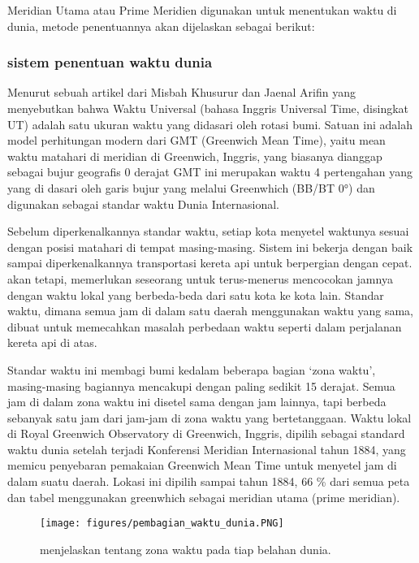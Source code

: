 	Meridian Utama atau Prime Meridien digunakan untuk menentukan waktu di dunia, metode penentuannya akan dijelaskan sebagai berikut:

\subsubsection{sistem penentuan waktu dunia}
	
	Menurut sebuah artikel dari Misbah Khusurur dan Jaenal Arifin yang menyebutkan bahwa Waktu Universal (bahasa Inggris Universal Time, disingkat UT) adalah satu ukuran waktu yang didasari oleh rotasi bumi. Satuan ini adalah model perhitungan modern dari GMT (Greenwich Mean Time), yaitu mean waktu matahari di meridian di Greenwich, Inggris, yang biasanya dianggap sebagai bujur geografis 0 derajat GMT ini merupakan waktu 4 pertengahan yang yang di dasari oleh garis bujur yang melalui Greenwhich (BB/BT 0°) dan digunakan sebagai standar waktu Dunia Internasional.
	
	Sebelum diperkenalkannya standar waktu, setiap kota menyetel waktunya sesuai dengan posisi matahari di tempat masing-masing. Sistem ini bekerja 
dengan baik sampai diperkenalkannya transportasi kereta api untuk berpergian dengan cepat. akan tetapi, memerlukan seseorang untuk terus-menerus mencocokan 
jamnya dengan waktu lokal yang berbeda-beda dari satu kota ke kota lain. Standar waktu, dimana semua jam di dalam satu daerah menggunakan waktu yang sama, 
dibuat untuk memecahkan masalah perbedaan waktu seperti dalam perjalanan kereta api di atas.

	Standar waktu ini membagi bumi kedalam beberapa bagian `zona waktu', masing-masing bagiannya mencakupi dengan paling sedikit 15 derajat. Semua jam di dalam
zona waktu ini disetel sama dengan jam lainnya, tapi berbeda sebanyak satu jam dari jam-jam di zona waktu yang bertetanggaan. 
Waktu lokal di Royal Greenwich Observatory di Greenwich, Inggris, dipilih sebagai standard waktu dunia setelah terjadi 
Konferensi Meridian Internasional tahun 1884, yang memicu penyebaran pemakaian Greenwich Mean Time untuk menyetel jam di dalam suatu daerah. 
Lokasi ini dipilih sampai tahun 1884, 66 \% dari semua peta dan tabel menggunakan greenwhich sebagai meridian utama (prime meridian).

\begin{figure}[ht]
\centerline{\texttt{[image: figures/pembagian\_waktu\_dunia.PNG]}}
\caption{menjelaskan tentang zona waktu pada tiap belahan dunia.}
\label{pembagian_waktu_dunia}
\end{figure}

